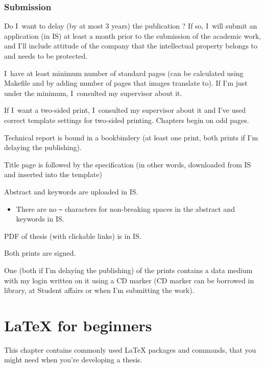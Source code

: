 \subsection*{Submission}
\begin{checklist}
	\item Do I~want to delay (by at most 3 years) the publication ? If so, I~will submit an application (in IS) at least a month prior to the submission of the academic work, and I'll include attitude of the company that the intellectual property belongs to and needs to be protected.
    \item I~have at least minimum number of standard pages (can be calculated using Makefile and by adding number of pages that images translate to). If I'm just under the minimum, I~consulted my supervisor about it.
   	\item If I~want a two-sided print, I~consulted my supervisor about it and I've used correct template settings for two-sided printing. Chapters begin on odd pages.
    \item Technical report is bound in a bookbindery (at least one print, both prints if I'm delaying the publishing).
    \item Title page is followed by the specification (in other words, downloaded from IS and inserted into the template)
    \item Abstract and keywords are uploaded in IS.
      \begin{itemize}
        \item There are no \verb|~| characters for non-breaking spaces in the abstract and keywords in IS.
      \end{itemize}     
    \item PDF of thesis (with clickable links) is in IS.
    \item Both prints are signed.
    \item One (both if I'm delaying the publishing) of the prints contains a data medium with my login written on it using a CD marker (CD marker can be borrowed in library, at Student affairs or when I'm submitting the work).
\end{checklist}

\chapter{\LaTeX{} for beginners}
\label{latex}

This chapter contains commonly used \LaTeX{} packages and commands, that you might need when you're developing a thesis.

